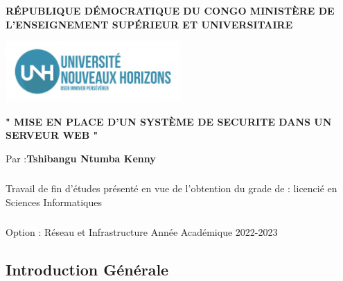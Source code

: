 

	\author{Tshibangu Ntumba Kenny}
	
	\begin{titlepage}
		
		 \centering
		
		\textbf{\Large RÉPUBLIQUE DÉMOCRATIQUE DU CONGO
			MINISTÈRE DE L’ENSEIGNEMENT SUPÉRIEUR ET UNIVERSITAIRE}
		\vspace{1.5cm}
		 
		 \includegraphics[width=0.5\textwidth]{Logo.jpg}
		 \vspace{3.5cm}
		 
		 
		 \textbf{\Large "  MISE EN PLACE D'UN SYSTÈME DE SECURITE DANS UN SERVEUR WEB "}
		 \vspace{2.5cm}
		 
		  \large Par :\textbf{Tshibangu Ntumba Kenny} 
		  
		  \paragraph{ } Travail de fin d’études présenté en vue de l’obtention
		  du grade de : licencié en Sciences Informatiques
		\paragraph{ } \Large{ Option : Réseau et Infrastructure}
		 \vfill
		 {\LARGE Année Académique 2022-2023}
		 \centering
	\end{titlepage}
\begin{center}
\tableofcontents
\pagebreak
\end{center}
	    \begin{abstract}
	    	 
	    \end{abstract}
	\begin{Huge}
		\chapter{ Introduction Générale}
 
	\end{Huge}
 
 \paragraph{ }
